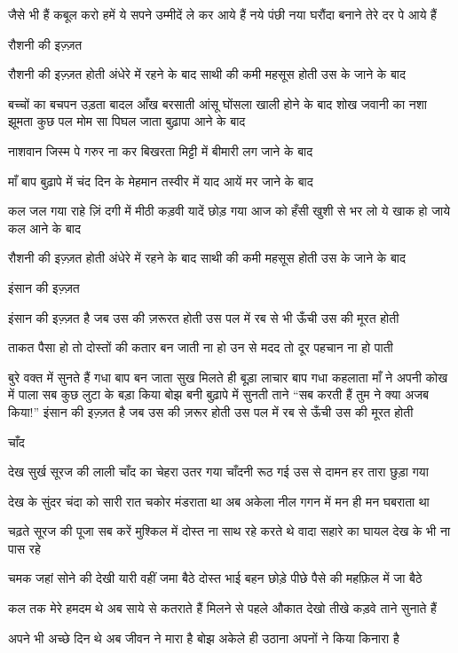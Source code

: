 जैसे भी हैं कबूल करो हमें
ये सपने उम्मीदें ले कर आये हैं
नये पंछी नया घरौंदा बनाने
तेरे दर पे आये हैं

रौशनी की इज़्ज़त

रौशनी की इज़्ज़त होती
अंधेरे में रहने के बाद
साथी की कमी महसूस होती
उस के जाने के बाद

बच्चों का बचपन उड़ता बादल
आँख बरसाती आंसू
घोंसला खाली होने के बाद
शोख जवानी का नशा झूमता कुछ पल
मोम सा पिघल जाता बुढ़ापा आने के बाद

नाशवान जिस्म पे गरुर ना कर
बिखरता मिट्टी में बीमारी लग जाने के बाद

माँ बाप बुढ़ापे में चंद दिन के मेहमान
तस्वीर में याद आयें मर जाने के बाद

कल जल गया राहे ज़िं दगी में
मीठी कड़वी यादें छोड़ गया
आज को हँसी खुशी से भर लो
ये खाक हो जाये कल आने के बाद

रौशनी की इज़्ज़त होती
अंधेरे में रहने के बाद
साथी की कमी महसूस होती
उस के जाने के बाद


इंसान की इज़्ज़त

इंसान की इज़्ज़त है जब उस की ज़रूरत होती
उस पल में रब से भी ऊँची उस की मूरत होती

ताकत पैसा हो तो दोस्तों की कतार बन जाती
ना हो उन से मदद तो दूर पहचान ना हो पाती

बुरे वक्त में सुनते हैं गधा बाप बन
जाता
सुख मिलते ही बूड़ा लाचार बाप गधा
कहलाता
माँ ने अपनी कोख में पाला
सब कुछ लुटा के बड़ा किया
बोझ बनी बुढ़ापे में सुनती ताने
“सब करती हैं तुम ने क्या अजब किया!”
इंसान की इज़्ज़त है जब उस की ज़रूर होती
उस पल में रब से ऊँची उस की मूरत होती





                          


              
चाँद 

देख सुर्ख सूरज की लाली
चाँद का चेहरा उतर गया
चाँदनी रूठ गई उस से
दामन हर तारा छुड़ा गया

देख के सुंदर चंदा को
सारी रात चकोर मंडराता था
अब अकेला नील गगन में
मन ही मन घबराता था

चढ़ते सूरज की पूजा सब करें
मुश्किल में दोस्त ना साथ रहे
करते थे वादा सहारे का
घायल देख के भी ना पास रहे

चमक जहां सोने की देखी
यारी वहीं जमा बैठे
दोस्त भाई बहन छोड़े पीछे
पैसे की महफ़िल में जा बैठे

कल तक मेरे हमदम थे
अब साये से कतराते हैं
मिलने से पहले औकात देखो
तीखे कड़वे ताने सुनाते हैं

अपने भी अच्छे दिन थे
अब जीवन ने मारा है
बोझ अकेले ही उठाना
अपनों ने किया किनारा है

